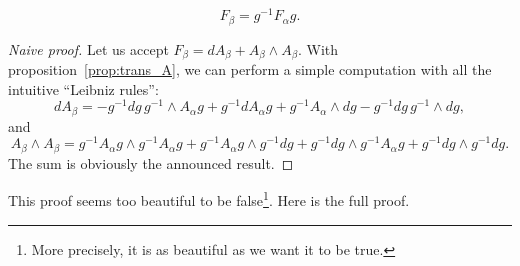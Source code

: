 \begin{theorem}
	\begin{equation}
		F_{\beta}=g^{-1} F_{\alpha} g.
	\end{equation}
	\label{tho:trans_F}
\end{theorem}

\begin{proof}[Naive proof]
	Let us accept $F_{\beta}=dA_{\beta}+A_{\beta}\wedge A_{\beta}$. With proposition~\ref{prop:trans_A}, we can perform a simple computation with all the intuitive ``Leibniz rules'':
	\[
		dA_{\beta}=-g^{-1} dg\, g^{-1}\wedge A_{\alpha} g+g^{-1} dA_{\alpha} g+g^{-1} A_{\alpha}\wedge dg-g^{-1} dg\,g^{-1}\wedge dg,
	\]
	and
	\[
		A_{\beta}\wedge A_{\beta}=g^{-1} A_{\alpha} g\wedge g^{-1} A_{\alpha} g+g^{-1} A_{\alpha} g\wedge g^{-1} dg+g^{-1} dg\wedge g^{-1} A_{\alpha} g+g^{-1} dg\wedge g^{-1} dg.
	\]
	The sum is obviously the announced result.
\end{proof}
This proof seems too beautiful to be false\footnote{More precisely, it is as beautiful as we want it to be true.}. Here is the full proof.


